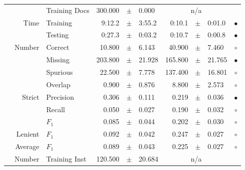 \begin{longtable}{|r|r|l||rcl|rcl|c|}
\cline{3-10} &                             &   Training Docs &     300.000 &  $\pm$  &       0.000 &    \multicolumn{3}{c|}{n/a}         &  \\
\cline{2-10} & \multirow{2}{*}{      Time} &        Training &      9:12.2 &  $\pm$  &      3:55.2 &      0:10.1 &  $\pm$  &      0:01.0 & $\bullet$ \\
\cline{3-10} &                             &         Testing &      0:27.3 &  $\pm$  &      0:03.2 &      0:10.7 &  $\pm$  &      0:00.8 & $\bullet$ \\
\hline
\pagebreak
\hline
\hline
\multirow{11}{*}{\begin{sideways}sellerabr\end{sideways} }
             & \multirow{4}{*}{    Number} &         Correct &      10.800 &  $\pm$  &       6.143 &      40.900 &  $\pm$  &       7.460 & $\circ$ \\
\cline{3-10} &                             &         Missing &     203.800 &  $\pm$  &      21.928 &     165.800 &  $\pm$  &      21.765 & $\bullet$ \\
\cline{3-10} &                             &        Spurious &      22.500 &  $\pm$  &       7.778 &     137.400 &  $\pm$  &      16.801 & $\circ$ \\
\cline{3-10} &                             &         Overlap &       0.900 &  $\pm$  &       0.876 &       8.800 &  $\pm$  &       2.573 & $\circ$ \\
\cline{2-10} & \multirow{3}{*}{    Strict} &       Precision &       0.306 &  $\pm$  &       0.111 &       0.219 &  $\pm$  &       0.036 & $\bullet$ \\
\cline{3-10} &                             &          Recall &       0.050 &  $\pm$  &       0.027 &       0.190 &  $\pm$  &       0.032 & $\circ$ \\
\cline{3-10} &                             &           $F_1$ &       0.085 &  $\pm$  &       0.044 &       0.202 &  $\pm$  &       0.030 & $\circ$ \\
\cline{2-10} &                     Lenient &           $F_1$ &       0.092 &  $\pm$  &       0.042 &       0.247 &  $\pm$  &       0.027 & $\circ$ \\
\cline{2-10} &                     Average &           $F_1$ &       0.089 &  $\pm$  &       0.043 &       0.225 &  $\pm$  &       0.027 & $\circ$ \\
\cline{2-10} & \multirow{2}{*}{    Number} &   Training Inst &     120.500 &  $\pm$  &      20.684 &    \multicolumn{3}{c|}{n/a}         &  \\

\end{longtable}
